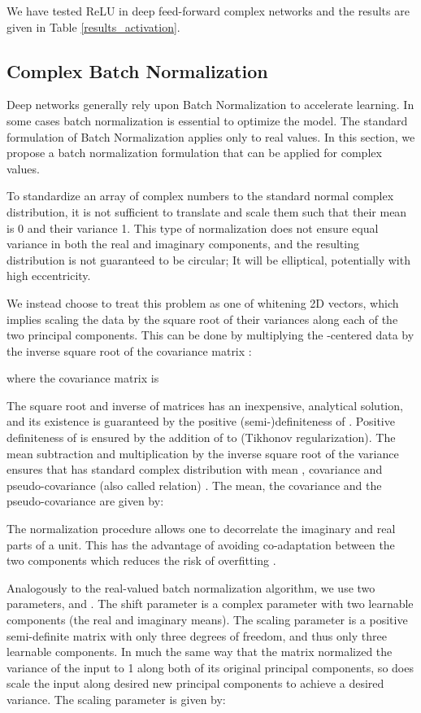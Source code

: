 \documentclass{article}
\begin{document}
We have tested ReLU in deep feed-forward complex networks and the results are given in Table \ref{results_activation}.

\subsection{Complex Batch Normalization}\label{cbn}
Deep networks generally rely upon Batch Normalization \citep{ioffe2015batch} to accelerate learning. In some cases batch normalization is essential to optimize the model. The standard formulation of Batch Normalization applies only to real values. In this section, we propose a batch normalization formulation that can be applied for complex values.

To standardize an array of complex numbers to the standard normal complex distribution, it is not sufficient to translate and scale them such that their mean is 0 and their variance 1. This type of normalization does not ensure equal variance in both the real and imaginary components, and the resulting distribution is not guaranteed to be circular; It will be elliptical, potentially with high eccentricity.

We instead choose to treat this problem as one of whitening 2D vectors, which implies scaling the data by the square root of their variances along each of the two principal components. This can be done by multiplying the -centered data  by the inverse square root of the  covariance matrix :

where the covariance matrix  is

The square root and inverse of  matrices has an inexpensive, analytical solution, and its existence is guaranteed by the positive (semi-)definiteness of . Positive definiteness of  is ensured by the addition of  to  (Tikhonov regularization). The mean subtraction and multiplication by the inverse square root of the variance ensures that  has standard complex distribution with mean , covariance  and pseudo-covariance (also called relation) . The mean, the covariance and the pseudo-covariance are given by:

The normalization procedure allows one to decorrelate the imaginary and real parts of a unit. This has the advantage of avoiding co-adaptation between the two components which reduces the risk of overfitting \citep{cogswell2015reducing, srivastava2014dropout}.

Analogously to the real-valued batch normalization algorithm, we use two parameters,  and . The shift parameter  is a complex parameter with two learnable components (the real and imaginary means). The scaling parameter  is a  positive semi-definite matrix with only three degrees of freedom, and thus only three learnable components. In much the same way that the matrix  normalized the variance of the input to 1 along both of its original principal components, so does  scale the input along desired new principal components to achieve a desired variance. The scaling parameter  is given by:
\end{document}
